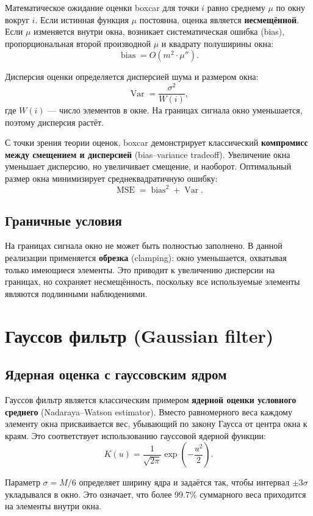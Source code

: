 \documentclass[12pt,a4paper]{article}
\begin{document}
Математическое ожидание оценки boxcar для точки $i$ равно среднему $\mu$ по окну вокруг $i$. Если истинная функция $\mu$ постоянна, оценка является \textbf{несмещённой}. Если $\mu$ изменяется внутри окна, возникает систематическая ошибка (bias), пропорциональная второй производной $\mu$ и квадрату полуширины окна:
\[
\operatorname{bias} = O(m^2 \cdot \mu'').
\]

Дисперсия оценки определяется дисперсией шума и размером окна:
\[
\operatorname{Var} = \frac{\sigma^2}{W(i)},
\]
где $W(i)$ --- число элементов в окне. На границах сигнала окно уменьшается, поэтому дисперсия растёт.

С точки зрения теории оценок, boxcar демонстрирует классический \textbf{компромисс между смещением и дисперсией} (bias--variance tradeoff). Увеличение окна уменьшает дисперсию, но увеличивает смещение, и наоборот. Оптимальный размер окна минимизирует среднеквадратичную ошибку:
\[
\operatorname{MSE} = \operatorname{bias}^2 + \operatorname{Var}.
\]

\subsection{Граничные условия}

На границах сигнала окно не может быть полностью заполнено. В данной реализации применяется \textbf{обрезка} (clamping): окно уменьшается, охватывая только имеющиеся элементы. Это приводит к увеличению дисперсии на границах, но сохраняет несмещённость, поскольку все используемые элементы являются подлинными наблюдениями.

\section{Гауссов фильтр (Gaussian filter)}

\subsection{Ядерная оценка с гауссовским ядром}

Гауссов фильтр является классическим примером \textbf{ядерной оценки условного среднего} (Nadaraya--Watson estimator). Вместо равномерного веса каждому элементу окна присваивается вес, убывающий по закону Гаусса от центра окна к краям. Это соответствует использованию гауссовой ядерной функции:
\[
K(u) = \frac{1}{\sqrt{2\pi}} \exp\!\left(-\frac{u^2}{2}\right).
\]

Параметр $\sigma = M/6$ определяет ширину ядра и задаётся так, чтобы интервал $\pm 3\sigma$ укладывался в окно. Это означает, что более 99.7\% суммарного веса приходится на элементы внутри окна.
\end{document}
